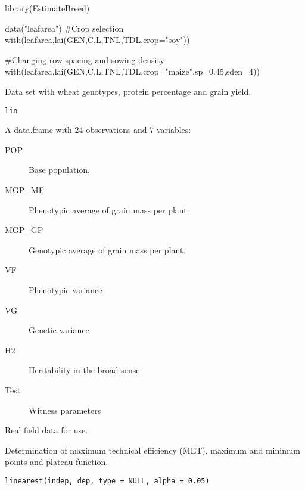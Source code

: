 \documentclass[a4paper]{book}
\begin{document}
%
\begin{Examples}
\begin{ExampleCode}

library(EstimateBreed)

data("leafarea")
#Crop selection
with(leafarea,lai(GEN,C,L,TNL,TDL,crop="soy"))

#Changing row spacing and sowing density
with(leafarea,lai(GEN,C,L,TNL,TDL,crop="maize",sp=0.45,sden=4))

\end{ExampleCode}
\end{Examples}
%
\begin{Description}
Data set with wheat genotypes, protein percentage and grain yield.
\end{Description}
%
\begin{Usage}
\begin{verbatim}
lin
\end{verbatim}
\end{Usage}
%
\begin{Format}
A data.frame with 24 observations and 7 variables:
\begin{description}

\item[POP] Base population.
\item[MGP\_MF] Phenotypic average of grain mass per plant.
\item[MGP\_GP] Genotypic average of grain mass per plant.
\item[VF] Phenotypic variance
\item[VG] Genetic variance
\item[H2] Heritability in the broad sense
\item[Test] Witness parameters

\end{description}

\end{Format}
%
\begin{Source}
Real field data for use.
\end{Source}
%
\begin{Description}
Determination of maximum technical efficiency (MET), maximum and minimum points
and plateau function.
\end{Description}
%
\begin{Usage}
\begin{verbatim}
linearest(indep, dep, type = NULL, alpha = 0.05)
\end{verbatim}
\end{Usage}
\end{document}
